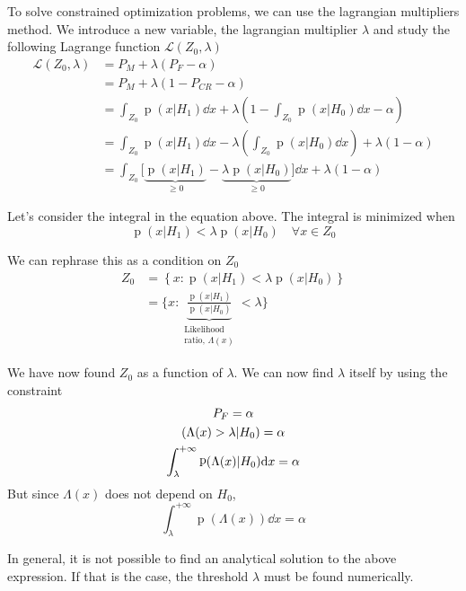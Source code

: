 \documentclass[oneside,onecolumn]{report}
\DeclareMathOperator*{\pdf}{p}
\let\P\relax
\DeclareMathOperator*{\P}{P}
\begin{document}
To solve constrained optimization problems, we can use the lagrangian multipliers method.
We introduce a new variable, the lagrangian multiplier $\lambda$ and study the following Lagrange function $\mathcal L(Z_0, \lambda)$
\begin{align*}
    \mathcal L(Z_0, \lambda)
    &= P_M + \lambda (P_F - \alpha) \\
    &= P_M + \lambda (1 - P_{CR} - \alpha) \\
    &= \int_{Z_0} \pdf(x | H_1) \dd x + \lambda \left(1 - \int_{Z_0} \pdf(x | H_0) \dd x - \alpha \right) \\
    &= \int_{Z_0} \pdf(x | H_1) \dd x - \lambda \left( \int_{Z_0} \pdf(x | H_0) \dd x \right) + \lambda \left(1 - \alpha \right) \\
    &= \int_{Z_0} \Big[ \underbrace{\pdf(x | H_1)}_{\geq 0} - \underbrace{\lambda \pdf(x | H_0)}_{\geq 0} \Big] \dd x + \lambda \left(1 - \alpha \right)
\end{align*}



Let's consider the integral in the equation above.
The integral is minimized when
$$ \pdf(x | H_1) < \lambda \pdf(x | H_0) \quad \forall x \in Z_0 $$

We can rephrase this as a condition on $Z_0$
\begin{align*}
    Z_0
    &= \left\{ x : \pdf(x | H_1) < \lambda \pdf(x | H_0) \right\} \\
    &= \Big\{ x : \underbrace{\frac{\pdf(x | H_1)}{\pdf(x | H_0)}}_{\substack{\text{Likelihood} \\ \text{ratio, } \Lambda(x) }} < \lambda \Big\}
\end{align*}

We have now found $Z_0$ as a function of $\lambda$.
We can now find $\lambda$ itself by using the constraint
\begin{gather*}
    P_F = \alpha \\
    \P(\Lambda(x) > \lambda | H_0) = \alpha \\
    \int_\lambda^{+\infty} \pdf(\Lambda(x) | H_0) \dd x = \alpha
\end{gather*}
But since $\Lambda(x)$ does not depend on $H_0$,
$$ \int_\lambda^{+\infty} \pdf(\Lambda(x)) \dd x = \alpha $$

In general, it is not possible to find an analytical solution to the above expression.
If that is the case, the threshold $\lambda$ must be found numerically.
\end{document}
